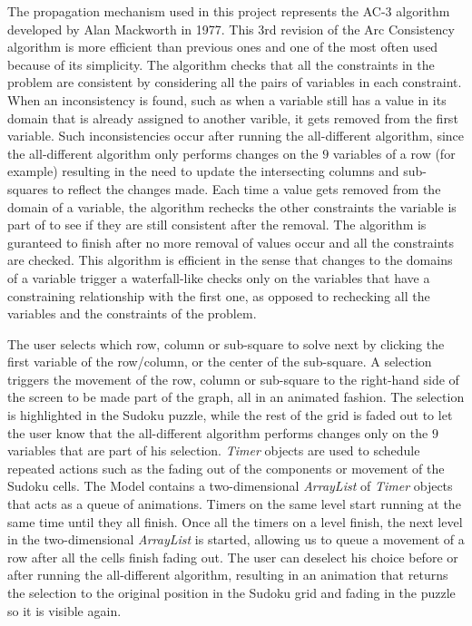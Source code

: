 \documentclass{l4proj}
\begin{document}
\noindent The propagation mechanism used in this project represents the AC-3 algorithm developed by Alan Mackworth \cite{mackworth1977consistency} in 1977. This 3rd revision of the Arc Consistency algorithm is more efficient than previous ones and one of the most often used because of its simplicity. The algorithm checks that all the constraints in the problem are consistent by considering all the pairs of variables in each constraint. When an inconsistency is found, such as when a variable still has a value in its domain that is already assigned to another varible, it gets removed from the first variable. Such inconsistencies occur after running the all-different algorithm, since the all-different algorithm only performs changes on the $9$ variables of a row (for example) resulting in the need to update the intersecting columns and sub-squares to reflect the changes made. Each time a value gets removed from the domain of a variable, the algorithm rechecks the other constraints the variable is part of to see if they are still consistent after the removal. The algorithm is guranteed to finish after no more removal of values occur and all the constraints are checked. This algorithm is efficient in the sense that changes to the domains of a variable trigger a waterfall-like checks only on the variables that have a constraining relationship with the first one, as opposed to rechecking all the variables and the constraints of the problem.

\noindent The user selects which row, column or sub-square to solve next by clicking the first variable of the row/column, or the center of the sub-square. A selection triggers the movement of the row, column or sub-square to the right-hand side of the screen to be made part of the graph, all in an animated fashion. The selection is highlighted in the Sudoku puzzle, while the rest of the grid is faded out to let the user know that the all-different algorithm performs changes only on the $9$ variables that are part of his selection. \textit{Timer} objects are used to schedule repeated actions such as the fading out of the components or movement of the Sudoku cells. The Model contains a two-dimensional \textit{ArrayList} of \textit{Timer} objects that acts as a queue of animations. Timers on the same level start running at the same time until they all finish. Once all the timers on a level finish, the next level in the two-dimensional \textit{ArrayList} is started, allowing us to queue a movement of a row after all the cells finish fading out. The user can deselect his choice before or after running the all-different algorithm, resulting in an animation that returns the selection to the original position in the Sudoku grid and fading in the puzzle so it is visible again.
\end{document}
